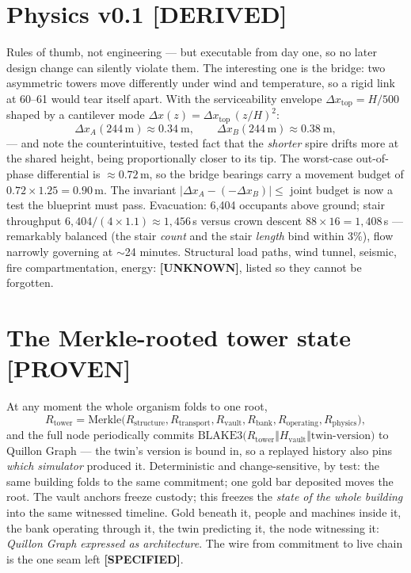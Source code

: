 \documentclass[11pt,a4paper]{article}
\newcommand{\claim}[1]{\textcolor{qsteel}{\textbf{\footnotesize[#1]}}}
\begin{document}
\section{Physics v0.1 \hfill \claim{DERIVED}}

Rules of thumb, not engineering --- but executable from day one, so no later
design change can silently violate them. The interesting one is the bridge: two
asymmetric towers move differently under wind and temperature, so a rigid link at
60--61 would tear itself apart. With the serviceability envelope
$\Delta x_{\text{top}} = H/500$ shaped by a cantilever mode
$\Delta x(z) = \Delta x_{\text{top}}\,(z/H)^2$:
\[
\Delta x_A(244\,\text{m}) \approx 0.34\ \text{m}, \qquad
\Delta x_B(244\,\text{m}) \approx 0.38\ \text{m},
\]
--- and note the counterintuitive, tested fact that the \emph{shorter} spire
drifts more at the shared height, being proportionally closer to its tip. The
worst-case out-of-phase differential is $\approx 0.72$\,m, so the bridge bearings
carry a movement budget of $0.72 \times 1.25 = 0.90$\,m. The invariant
$|\Delta x_A - (-\Delta x_B)| \leq$ joint budget is now a test the blueprint must
pass. Evacuation: 6{,}404 occupants above ground; stair throughput
$6{,}404/(4 \times 1.1) \approx 1{,}456$\,s versus crown descent
$88 \times 16 = 1{,}408$\,s --- remarkably balanced (the stair \emph{count} and
the stair \emph{length} bind within 3\%), flow narrowly governing at $\sim$24
minutes. Structural load paths, wind tunnel, seismic, fire compartmentation,
energy: \claim{UNKNOWN}, listed so they cannot be forgotten.

\section{The Merkle-rooted tower state \hfill \claim{PROVEN}}

At any moment the whole organism folds to one root,
\[
R_{\text{tower}} = \mathrm{Merkle}\big(R_{\text{structure}}, R_{\text{transport}},
R_{\text{vault}}, R_{\text{bank}}, R_{\text{operating}}, R_{\text{physics}}\big),
\]
and the full node periodically commits
$\mathrm{BLAKE3}\big(R_{\text{tower}} \Vert H_{\text{vault}} \Vert
\text{twin-version}\big)$ to Quillon Graph --- the twin's version is bound in, so
a replayed history also pins \emph{which simulator} produced it. Deterministic and
change-sensitive, by test: the same building folds to the same commitment; one
gold bar deposited moves the root. The vault anchors freeze custody; this freezes
the \emph{state of the whole building} into the same witnessed timeline. Gold
beneath it, people and machines inside it, the bank operating through it, the twin
predicting it, the node witnessing it: \emph{Quillon Graph expressed as
architecture}. The wire from commitment to live chain is the one seam left
\claim{SPECIFIED}.
\end{document}
